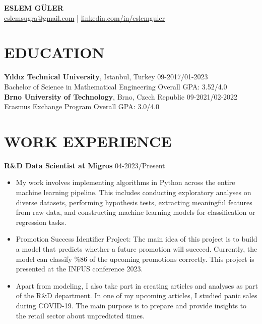 \documentclass[letterpaper,9pt]{extarticle} %
\begin{document}
\pagestyle{empty}

\begin{center}
\textbf{\Large ESLEM GÜLER}\\[2pt] %
\href{mailto:example@example.com}{eslemsugra@gmail.com} | \href{https://www.linkedin.com/in/johndoe}{linkedin.com/in/eslemguler} %
\end{center}

\section*{EDUCATION}
\noindent
\textbf{Yıldız Technical University}, Istanbul, Turkey \hfill 09-2017/01-2023\\ %
Bachelor of Science in Mathematical Engineering \hfill Overall GPA: 3.52/4.0\\ %
\textbf{Brno University of Technology}, Brno, Czech Republic \hfill 09-2021/02-2022\\ %
Erasmus Exchange Program \hfill Overall GPA: 3.0/4.0 %
\section*{WORK EXPERIENCE}
\noindent
\textbf{R\&D Data Scientist at Migros} \hfill 04-2023/Present %
\begin{itemize}
\item My work involves implementing algorithms in Python across the entire machine learning pipeline. This includes conducting exploratory analyses on diverse datasets, performing hypothesis tests, extracting meaningful features from raw data, and constructing machine learning models for classification or regression tasks.
    \item Promotion Success Identifier Project: The main idea of this project is to build a model that predicts whether a future promotion will succeed. Currently, the model can classify \%86 of the upcoming promotions correctly. This project is presented at the INFUS conference 2023.
    \item Apart from modeling, I also take part in creating articles and analyses as part of the R\&D department. In one of my upcoming articles, I studied panic sales during COVID-19. The main purpose is to prepare and provide insights to the retail sector about unpredicted times.
\end{itemize}
\end{document}
